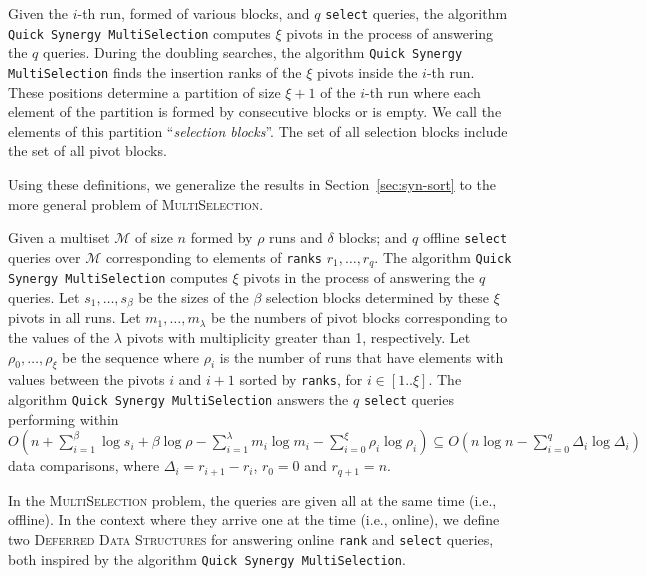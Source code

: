 \begin{INUTILE}
  \begin{definition}
    Given the $i$-th run, formed of various blocks, and $q$
    \texttt{select} queries, the algorithm \texttt{Quick Synergy
      MultiSelection} computes $\xi$ pivots in the process of
    answering the $q$ queries. During the doubling searches, the
    algorithm \texttt{Quick Synergy MultiSelection} finds the
    insertion ranks of the $\xi$ pivots inside the $i$-th run. These
    positions determine a partition of size $\xi+1$ of the $i$-th run
    where each element of the partition is formed by consecutive
    blocks or is empty. We call the elements of this partition
    ``\emph{selection blocks}''. The set of all selection blocks
    include the set of all pivot blocks.
  \end{definition}

Using these definitions, we generalize the results in Section~\ref{sec:syn-sort} to the more general problem of \textsc{MultiSelection}.

\begin{theorem}\label{theo:qsms}
  Given a multiset $\mathcal{M}$ of size $n$ formed by $\rho$ runs and
  $\delta$ blocks; and $q$ offline \texttt{select} queries over
  $\mathcal{M}$ corresponding to elements of \texttt{ranks}
  $r_1, \dots, r_q$. The algorithm \texttt{Quick Synergy
    MultiSelection} computes $\xi$ pivots in the process of answering
  the $q$ queries. Let $s_1,\dots, s_{\beta}$ be the sizes of the
  $\beta$ selection blocks determined by these $\xi$ pivots in all
  runs. Let $m_1, \dots, m_\lambda$ be the numbers of pivot blocks
  corresponding to the values of the $\lambda$ pivots with
  multiplicity greater than 1, respectively.  Let
  $\rho_0, \dots, \rho_\xi$ be the sequence where $\rho_i$ is the
  number of runs that have elements with values between the pivots $i$
  and $i+1$ sorted by \texttt{ranks}, for $i\in[1..\xi]$.  The
  algorithm \texttt{Quick Synergy MultiSelection} answers the $q$
  \texttt{select} queries performing within
  $O(n + \sum^{\beta}_{i=1}\log{s_i} +
    \beta\log{\rho}-\sum^{\lambda}_{i=1}m_i\log{m_i} -
    \sum^{\xi}_{i=0}\rho_i\log{\rho_i}) \subseteq
  O(n\log{n} - \sum^{q}_{i=0}\Delta_i\log{\Delta_i})$ data
  comparisons, where $\Delta_i = r_{i+1} - r_i$, $r_0=0$ and
  $r_{q+1}=n$.
\end{theorem}
\end{INUTILE}

In the \textsc{MultiSelection} problem, the queries are given all at the same time (i.e.,
offline). In the context where they arrive one at the time (i.e., online), we define
two \textsc{Deferred Data Structures} for answering online
\texttt{rank} and \texttt{select} queries, both inspired by the algorithm
\texttt{Quick Synergy MultiSelection}.

